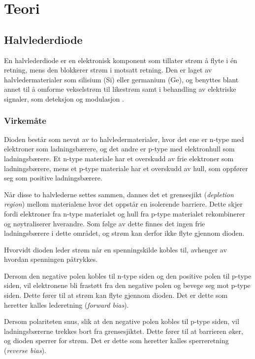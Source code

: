    \section{Teori}
    \subsection{Halvlederdiode}
        En halvlederdiode er en elektronisk komponent som tillater strøm å flyte i én retning, mens den blokkerer strøm i motsatt retning. Den er laget av halvledermaterialer som silisium (Si) eller germanium (Ge), og benyttes blant annet til å omforme vekselstrøm til likestrøm samt i behandling av elektriske signaler, som deteksjon og modulasjon \cite{snl_halvlederdiode}.

            \subsubsection{Virkemåte}
                Dioden består som nevnt av to halvledermaterialer, hvor det ene er n-type med elektroner som ladningsbærere, og det andre er p-type med elektronhull som ladningsbærere. Et n-type materiale har et overskudd av frie elektroner som ladningsbærere, mens et p-type materiale har et overskudd av hull, som oppfører seg som positive ladningsbærere.

                Når disse to halvlederne settes sammen, dannes det et grensesjikt (\textit{depletion region}) mellom materialene hvor det oppstår en isolerende barriere. Dette skjer fordi elektroner fra n-type materialet og hull fra p-type materialet rekombinerer og nøytraliserer hverandre. Som følge av dette finnes det ingen frie ladningsbærere i dette området, og strøm kan derfor ikke flyte gjennom dioden.

                Hvorvidt dioden leder strøm når en spenningskilde kobles til, avhenger av hvordan spenningen påtrykkes.

                Dersom den negative polen kobles til n-type siden og den positive polen til p-type siden, vil elektronene bli frastøtt fra den negative polen og bevege seg mot p-type siden. Dette fører til at strøm kan flyte gjennom dioden. Det er dette som heretter kalles lederetning (\textit{forward bias}).

                Dersom polariteten snus, slik at den negative polen kobles til p-type siden, vil ladningsbærerne trekkes bort fra grensesjiktet. Dette fører til at barrieren øker, og dioden sperrer for strøm. Det er dette som heretter kalles sperreretning (\textit{reverse bias}).

